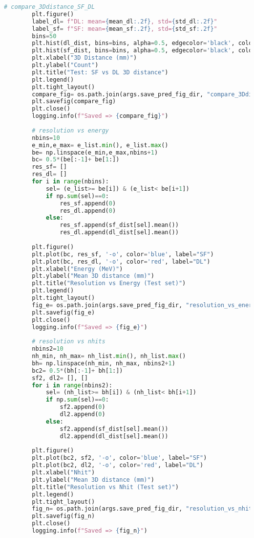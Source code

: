 \begin{lstlisting}[language=Python, caption={模型训练、验证与测试对比脚本 (train\_val\_test\_compare\_v1.py)}, label={lst:train_script}]
        # compare_3Ddistance_SF_DL
        plt.figure()
        label_dl= f"DL: mean={mean_dl:.2f}, std={std_dl:.2f}"
        label_sf= f"SF: mean={mean_sf:.2f}, std={std_sf:.2f}"
        bins=50
        plt.hist(dl_dist, bins=bins, alpha=0.5, edgecolor='black', color='red', label=label_dl)
        plt.hist(sf_dist, bins=bins, alpha=0.5, edgecolor='black', color='blue', label=label_sf)
        plt.xlabel("3D Distance (mm)")
        plt.ylabel("Count")
        plt.title("Test: SF vs DL 3D distance")
        plt.legend()
        plt.tight_layout()
        compare_fig= os.path.join(args.save_pred_fig_dir, "compare_3Ddistance_SF_DL_v1.png")
        plt.savefig(compare_fig)
        plt.close()
        logging.info(f"Saved => {compare_fig}")
    
        # resolution vs energy
        nbins=10
        e_min,e_max= e_list.min(), e_list.max()
        be= np.linspace(e_min,e_max,nbins+1)
        bc= 0.5*(be[:-1]+ be[1:])
        res_sf= []
        res_dl= []
        for i in range(nbins):
            sel= (e_list>= be[i]) & (e_list< be[i+1])
            if np.sum(sel)==0:
                res_sf.append(0)
                res_dl.append(0)
            else:
                res_sf.append(sf_dist[sel].mean())
                res_dl.append(dl_dist[sel].mean())
    
        plt.figure()
        plt.plot(bc, res_sf, '-o', color='blue', label="SF")
        plt.plot(bc, res_dl, '-o', color='red', label="DL")
        plt.xlabel("Energy (MeV)")
        plt.ylabel("Mean 3D distance (mm)")
        plt.title("Resolution vs Energy (Test set)")
        plt.legend()
        plt.tight_layout()
        fig_e= os.path.join(args.save_pred_fig_dir, "resolution_vs_energy_v1.png")
        plt.savefig(fig_e)
        plt.close()
        logging.info(f"Saved => {fig_e}")
    
        # resolution vs nhits
        nbins2=10
        nh_min, nh_max= nh_list.min(), nh_list.max()
        bh= np.linspace(nh_min, nh_max, nbins2+1)
        bc2= 0.5*(bh[:-1]+ bh[1:])
        sf2, dl2= [], []
        for i in range(nbins2):
            sel= (nh_list>= bh[i]) & (nh_list< bh[i+1])
            if np.sum(sel)==0:
                sf2.append(0)
                dl2.append(0)
            else:
                sf2.append(sf_dist[sel].mean())
                dl2.append(dl_dist[sel].mean())
    
        plt.figure()
        plt.plot(bc2, sf2, '-o', color='blue', label="SF")
        plt.plot(bc2, dl2, '-o', color='red', label="DL")
        plt.xlabel("Nhit")
        plt.ylabel("Mean 3D distance (mm)")
        plt.title("Resolution vs Nhit (Test set)")
        plt.legend()
        plt.tight_layout()
        fig_n= os.path.join(args.save_pred_fig_dir, "resolution_vs_nhits_v1.png")
        plt.savefig(fig_n)
        plt.close()
        logging.info(f"Saved => {fig_n}")
    

\end{lstlisting}
